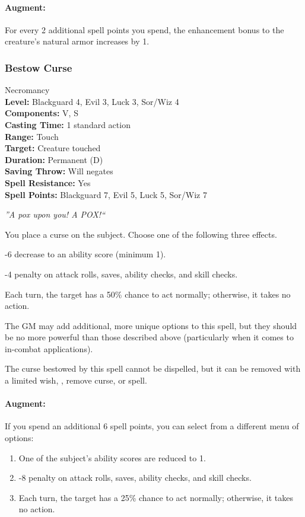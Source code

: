 \paragraph{Augment:} For every 2 additional spell points you spend, the enhancement bonus to the creature's natural armor increases by 1.
\subsubsection{Bestow Curse}
\label{Spell:BestowCurse}
Necromancy
\\ \textbf{Level:} Blackguard 4, Evil 3, Luck 3, Sor/Wiz 4
\\ \textbf{Components:} V, S
\\ \textbf{Casting Time:} 1 standard action
\\ \textbf{Range:} Touch
\\ \textbf{Target:} Creature touched
\\ \textbf{Duration:} Permanent (D)
\\ \textbf{Saving Throw:} Will negates
\\ \textbf{Spell Resistance:} Yes
\\ \textbf{Spell Points:} Blackguard 7, Evil 5, Luck 5, Sor/Wiz 7

\emph{''A pox upon you! A POX!``}

You place a curse on the subject. Choose one of the following three effects.
\begin{list}{}{\leftmargin=1em}
 \item -6 decrease to an ability score (minimum 1).
 \item -4 penalty on attack rolls, saves, ability checks, and skill checks.
 \item Each turn, the target has a 50\% chance to act normally; otherwise, it takes no action.
\end{list}
The GM may add additional, more unique options to this spell, 
but they should be no more powerful than those described above (particularly when it comes to in-combat applications).

The curse bestowed by this spell cannot be dispelled, but it can be removed with a limited wish, , remove curse, or  spell.

\paragraph{Augment:} If you spend an additional 6 spell points, you can select from a different menu of options:
\begin{enumerate}
 \item One of the subject's ability scores are reduced to 1.
 \item -8 penalty on attack rolls, saves, ability checks, and skill checks.
 \item Each turn, the target has a 25\% chance to act normally; otherwise, it takes no action.
\end{enumerate}
